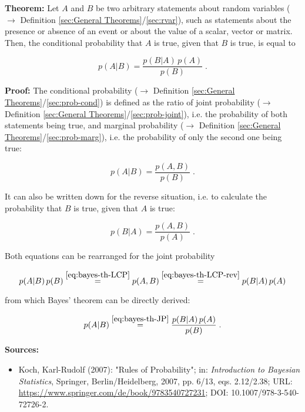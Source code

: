 \documentclass[a4paper,12pt,twoside]{book}
\begin{document}
\textbf{Theorem:} Let $A$ and $B$ be two arbitrary statements about random variables ($\rightarrow$ Definition \ref{sec:General Theorems}/\ref{sec:rvar}), such as statements about the presence or absence of an event or about the value of a scalar, vector or matrix. Then, the conditional probability that $A$ is true, given that $B$ is true, is equal to

\begin{equation} \label{eq:bayes-th-BT}
p(A|B) = \frac{p(B|A) \, p(A)}{p(B)} \; .
\end{equation}


\vspace{1em}
\textbf{Proof:} The conditional probability ($\rightarrow$ Definition \ref{sec:General Theorems}/\ref{sec:prob-cond}) is defined as the ratio of joint probability ($\rightarrow$ Definition \ref{sec:General Theorems}/\ref{sec:prob-joint}), i.e. the probability of both statements being true, and marginal probability ($\rightarrow$ Definition \ref{sec:General Theorems}/\ref{sec:prob-marg}), i.e. the probability of only the second one being true:

\begin{equation} \label{eq:bayes-th-LCP}
p(A|B) = \frac{p(A,B)}{p(B)} \; .
\end{equation}

It can also be written down for the reverse situation, i.e. to calculate the probability that $B$ is true, given that $A$ is true:

\begin{equation} \label{eq:bayes-th-LCP-rev}
p(B|A) = \frac{p(A,B)}{p(A)} \; .
\end{equation}

Both equations can be rearranged for the joint probability

\begin{equation} \label{eq:bayes-th-JP}
p(A|B) \, p(B) \overset{\eqref{eq:bayes-th-LCP}}{=} p(A,B) \overset{\eqref{eq:bayes-th-LCP-rev}}{=} p(B|A) \, p(A)
\end{equation}

from which Bayes' theorem can be directly derived:

\begin{equation} \label{eq:bayes-th-BT-proof}
p(A|B) \overset{\eqref{eq:bayes-th-JP}}{=} \frac{p(B|A) \, p(A)}{p(B)} \; .
\end{equation}


\vspace{1em}
\textbf{Sources:}
\begin{itemize}
\item Koch, Karl-Rudolf (2007): "Rules of Probability"; in: \textit{Introduction to Bayesian Statistics}, Springer, Berlin/Heidelberg, 2007, pp. 6/13, eqs. 2.12/2.38; URL: \url{https://www.springer.com/de/book/9783540727231}; DOI: 10.1007/978-3-540-72726-2.
\end{itemize}
\end{document}
